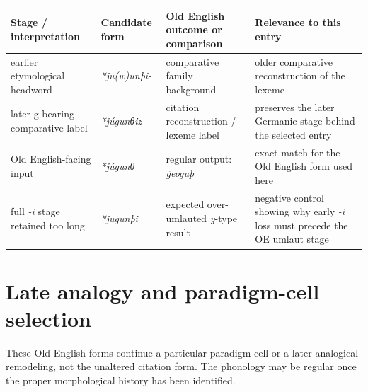 \documentclass[
  british,
  a4paper,
  openany]{book}
\newcounter{none} %
\begin{document}
{\def\LTcaptype{none} %
\begin{longtable}[]{@{}
  >{\raggedright\arraybackslash}p{}
  >{\raggedright\arraybackslash}p{}
  >{\raggedright\arraybackslash}p{}
  >{\raggedright\arraybackslash}p{}@{}}
\toprule\noalign{}
\begin{minipage}[b]{\linewidth}\raggedright
Stage / interpretation
\end{minipage} & \begin{minipage}[b]{\linewidth}\raggedright
Candidate form
\end{minipage} & \begin{minipage}[b]{\linewidth}\raggedright
Old English outcome or comparison
\end{minipage} & \begin{minipage}[b]{\linewidth}\raggedright
Relevance to this entry
\end{minipage} \\
\midrule\noalign{}
\endhead
\bottomrule\noalign{}
\endlastfoot
earlier etymological headword & {\emph{*ju(w)unþi-}} & comparative
family background & older comparative reconstruction of the lexeme \\
later g-bearing comparative label & {\emph{*júgunθiz}} & citation
reconstruction / lexeme label & preserves the later Germanic stage
behind the selected entry \\
Old English-facing input & {\emph{*júgunθ}} & regular output:
{\emph{ġeoguþ}} & exact match for the Old English form used here \\
full \emph{-i} stage retained too long & {\emph{*jugunþi}} & expected
over-umlauted \emph{y}-type result & negative control showing why early
\emph{-i} loss must precede the OE umlaut stage \\
\end{longtable}
}

\clearpage

\chapter{Late analogy and paradigm-cell
selection}\label{late-analogy-and-paradigm-cell-selection}

These Old English forms continue a particular paradigm cell or a later
analogical remodeling, not the unaltered citation form. The phonology
may be regular once the proper morphological history has been
identified.
\end{document}
